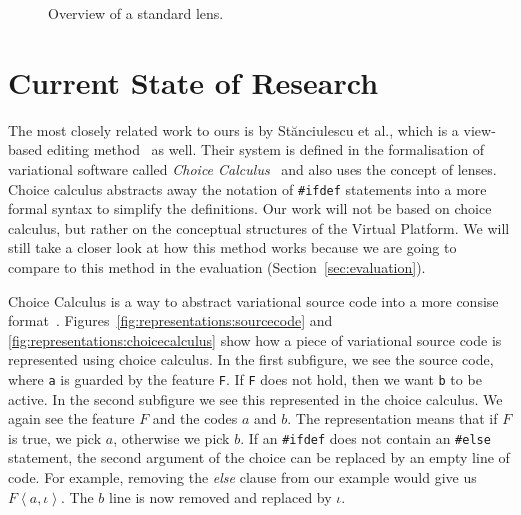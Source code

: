 \begin{figure}
  \centering
  \caption{Overview of a standard lens.}
  \label{fig:lens:overview}
\end{figure}

\section{Current State of Research}
The most closely related work to ours is by St{\u{a}}nciulescu et al., which is
a view-based editing method~\cite{stuanciulescu2016} as well. Their system is
defined in the formalisation of variational software called \emph{Choice Calculus}~\cite{walkingshaw2014}
and also uses the concept of lenses.
Choice calculus abstracts away the notation of \texttt{\#ifdef} statements into
a more formal syntax to simplify the definitions. Our work will not be 
based on choice calculus, but rather on the conceptual structures of the Virtual
Platform. We will still take a closer look at how this method works because we are
going to compare to this method in the evaluation (Section~\ref{sec:evaluation}).

Choice Calculus is a way to abstract variational source code into a more consise
format~\cite{erwig2011choice}. Figures~\ref{fig:representations:sourcecode} and 
\ref{fig:representations:choicecalculus} show how a piece of variational source
code is represented using choice calculus. In the first subfigure, we see the source
code, where \texttt{a} is guarded by the feature \texttt{F}. If \texttt{F} does not
hold, then we want \texttt{b} to be active. In the second subfigure we see this
represented in the choice calculus. We again see the feature $F$ and the codes $a$
and $b$. The representation means that if $F$ is true, we pick $a$, otherwise we
pick $b$. If an \texttt{\#ifdef} does not contain an \texttt{\#else} statement,
the second argument of the choice can be replaced by an empty line of code. For
example, removing the \emph{else} clause from our example would give us \(\mathit{F}\!\left<a, \iota\right>\).
The $b$ line is now removed and replaced by \(\iota\). 

